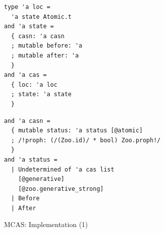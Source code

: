 \begin{figure}
\begin{minipage}[t]{.45\textwidth}
\begin{lstlisting}
type 'a loc =
  'a state Atomic.t
and 'a state =
  { casn: 'a casn
  ; mutable before: 'a
  ; mutable after: 'a
  }
and 'a cas =
  { loc: 'a loc
  ; state: 'a state
  }
\end{lstlisting}
\end{minipage}
\begin{minipage}[t]{.45\textwidth}
\begin{lstlisting}
and 'a casn =
  { mutable status: 'a status [@atomic]
  ; /!proph: (/(Zoo.id)/ * bool) Zoo.proph!/
  }
and 'a status =
  | Undetermined of 'a cas list
    [@generative]
    [@zoo.generative_strong]
  | Before
  | After
\end{lstlisting}
\end{minipage}
\caption{MCAS: Implementation (1)}
\label{fig:mcas_code_1}
\end{figure}